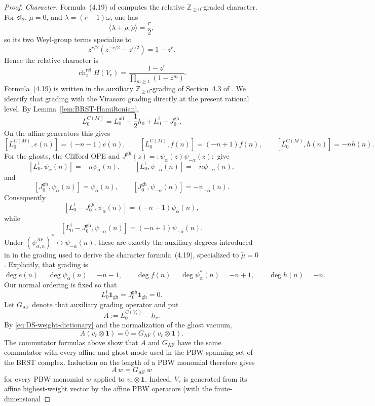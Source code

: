 \documentclass[12pt,leqno]{amsart}
\numberwithin{equation}{section}
\def\Z{\mathbb{Z}}
\begin{document}
\begin{proof}
\emph{Character.}  Formula~(4.19) of \cite{ArakawaFrenkel} computes the
relative $\Z_{\ge0}$-graded character.  For $\mathfrak{sl}_2$,
$\check\mu=0$, and $\lambda=(r-1)\omega$, one has
\[
 \langle\lambda+\rho,\check\rho\rangle=\frac r2,
\]
so its two Weyl-group terms specialize to
\[
 z^{r/2}(z^{-r/2}-z^{r/2})=1-z^r.
\]
Hence the relative character is
\[
 \operatorname{ch}^{\mathrm{rel}}_z H(V_r)
 =\frac{1-z^r}{\prod_{m\ge1}(1-z^m)}.
\]
Formula~(4.19) is written in the auxiliary $\Z_{\ge0}$-grading of
Section~4.3 of \cite{ArakawaFrenkel}.  We identify that grading with the
Virasoro grading directly at the present rational level.  By
Lemma~\ref{lem:BRST-Hamiltonian},
\[
 L^{C(M)}_0=L^{\mathrm{aff}}_0-\frac12h_0
 +L^{\mathrm f}_0-J^{\mathrm{gh}}_0.
\]
On the affine generators this gives
\[
 [L^{C(M)}_0,e(n)]=(-n-1)e(n),\qquad
 [L^{C(M)}_0,f(n)]=(-n+1)f(n),\qquad
 [L^{C(M)}_0,h(n)]=-nh(n).
\]
For the ghosts, the Clifford OPE and
$J^{\mathrm{gh}}(z)=:\psi_\alpha(z)\psi_{-\alpha}(z):$ give
\[
 [L^{\mathrm f}_0,\psi_\alpha(n)]=-n\psi_\alpha(n),\qquad
 [L^{\mathrm f}_0,\psi_{-\alpha}(n)]=-n\psi_{-\alpha}(n),
\]
and
\[
 [J^{\mathrm{gh}}_0,\psi_\alpha(n)]=\psi_\alpha(n),\qquad
 [J^{\mathrm{gh}}_0,\psi_{-\alpha}(n)]=-\psi_{-\alpha}(n).
\]
Consequently
\[
 [L^{\mathrm f}_0-J^{\mathrm{gh}}_0,\psi_\alpha(n)]
 =(-n-1)\psi_\alpha(n),
\]
while
\[
 [L^{\mathrm f}_0-J^{\mathrm{gh}}_0,\psi_{-\alpha}(n)]
 =(-n+1)\psi_{-\alpha}(n).
\]
Under $(\psi^{AF}_{\alpha,n})^*\leftrightarrow\psi_{-\alpha}(n)$,
these are exactly the auxiliary degrees introduced in
\cite[Section~4.3]{ArakawaFrenkel} in the grading used to derive the
character formula~(4.19), specialized to $\check\mu=0$.  Explicitly,
that grading is
\[
 \deg e(n)=\deg\psi_\alpha(n)=-n-1,\qquad
 \deg f(n)=\deg\psi^*_\alpha(n)=-n+1,\qquad
 \deg h(n)=-n.
\]
Our normal ordering is fixed so that
\[
 L^{\mathrm f}_0\mathbf1_{\mathrm{gh}}
 =J^{\mathrm{gh}}_0\mathbf1_{\mathrm{gh}}=0.
\]
Let $G_{\mathrm{AF}}$ denote that auxiliary grading operator and put
\[
 A:=L^{C(V_r)}_0-h_r.
\]
By \eqref{eq:DS-weight-dictionary} and the normalization of the ghost
vacuum,
\[
 A(v_r\otimes\mathbf1)=0=G_{\mathrm{AF}}(v_r\otimes\mathbf1).
\]
The commutator formulas above show that $A$ and $G_{\mathrm{AF}}$ have
the same commutator with every affine and ghost mode used in the PBW
spanning set of the BRST complex.  Induction on the length of a PBW
monomial therefore gives
\[
 A\,w=G_{\mathrm{AF}}\,w
\]
for every PBW monomial $w$ applied to
$v_r\otimes\mathbf1$.  Indeed, $V_r$ is generated from its affine
highest-weight vector by the affine PBW operators (with the finite-dimensional

\end{proof}
\end{document}
